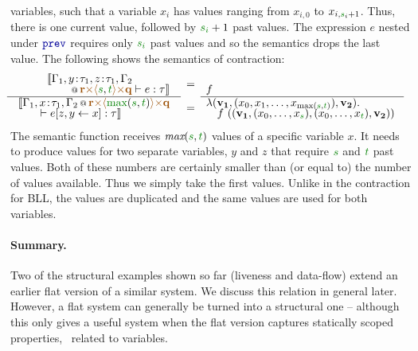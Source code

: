 variables, such that a variable $x_i$ has values ranging from $x_{i,0}$ to $x_{i,\cclrd{s}_i + 1}$.
Thus, there is one current value, followed by $\cclrd{s_i} + 1$ past values. The expression $e$
nested under $\kvd{prev}$ requires only $\cclrd{s_i}$ past values and so the semantics
drops the last value. The following shows the semantics of contraction:
%
\begin{equation*}
\hspace{-1em}
\begin{array}{l}
\mdeff
  {\begin{array}{l}\sem{\coctx{\Gamma_1,y\!:\!\tau_1,z\!:\!\tau_1,\Gamma_2\\[-0.25em]\qquad}
      {\aclrd{\textbf{r}} \atimes \alift{\cclrd{s},\cclrd{t}} \atimes \aclrd{\textbf{q}}} \vdash e : \tau}\end{array}}
  {\begin{array}{l}\sem{\coctx{\Gamma_1,x\!:\!\tau_1,\Gamma_2}{\aclrd{\textbf{r}}
          \atimes \alift{\cclrd{\textnormal{max}}(\cclrd{s}, \cclrd{t})} \atimes \aclrd{\textbf{q}}} \\[-0.25em] \qquad\vdash \subst{e}{z,y}{x} : \tau}\end{array}}
  {\begin{array}{l}~\\[-0.25em]\hspace{-0.5em}f\end{array}}
  {\hspace{-0.5em}\begin{array}{l}\lambda(\mathbf{v_1}, (x_0, x_1, \ldots, x_{ \textnormal{max}(\cclrd{s},\cclrd{t}) }), \mathbf{v_2}) .\\[-0.25em]
  \quad f~((\mathbf{v_1}, (x_0, \ldots, x_{\cclrd{s}}), (x_0, \ldots, x_{\cclrd{t}} ), \mathbf{v_2}))\end{array}\hspace{-0.5em}~}
\end{array}
\end{equation*}
%
The semantic function receives $\emph{max}(\cclrd{s}, \cclrd{t})$ values
of a specific variable $x$. It needs to produce values for two separate variables, $y$ and $z$ that
require $\cclrd{s}$ and $\cclrd{t}$ past values. Both of these numbers are certainly smaller than
(or equal to) the number of values available. Thus we simply take the first values. Unlike in the
contraction for BLL, the values are duplicated and the same values are used for both variables.

\paragraph{Summary.}
Two of the structural examples shown so far (liveness and data-flow) extend an earlier flat
version of a similar system. We discuss this relation in general later. However, a flat system
can generally be turned into a structural one -- although this only gives a useful system when
the flat version captures statically scoped properties, \ie~related to variables.

